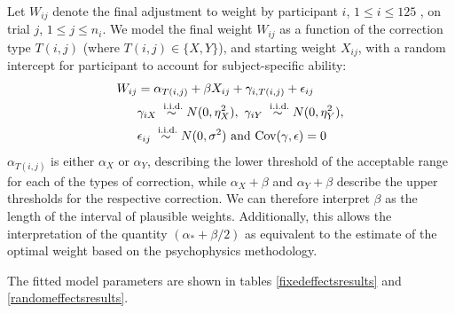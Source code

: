 \documentclass[12pt]{article}\usepackage[]{graphicx}\usepackage[]{color}
\begin{document}
\begin{appendix}
Let $W_{ij}$ denote the final adjustment to weight by participant $i$, $ 1 \le i \le 125$ , on trial $j$, $1 \le j \le n_i$. 
We model the final weight $W_{ij}$ as a function of the correction type $T(i,j)$  (where $T(i,j) \in  \{X, Y\}$), and starting weight $X_{ij}$, with a random intercept for participant to account for subject-specific ability: 
\begin{align}\label{model1}
W_{ij} &= \alpha_{T(i,j)} + \beta X_{ij} + \gamma_{i, T(i,j)} + \epsilon_{ij}\\
& \gamma_{iX} \stackrel{\text{ i.i.d.}}{\sim} N(0, \eta_X^2) , \ \gamma_{iY} \stackrel{\text{ i.i.d.}}{\sim} N(0, \eta_Y^2) ,\notag  \\
& \epsilon_{ij} \stackrel{\text{ i.i.d.}}{\sim} N(0, \sigma^2)  \text{ and } \text{Cov}(\gamma, \epsilon) = 0\notag 
\end{align}
 $\alpha_{T(i,j)}$ is either $\alpha_X$ or $\alpha_Y$, describing the lower threshold of the acceptable range for each of the types of correction, while $\alpha_X+\beta$ and $\alpha_Y + \beta$ describe the upper thresholds for the respective correction.
%
%
We can therefore interpret $\beta$ as the length of the interval of plausible weights. Additionally, this allows the interpretation of the quantity $(\alpha_* + \beta/2)$ as equivalent to the estimate of the optimal weight based on the psychophysics methodology.

\noindent
The fitted model parameters are shown in tables \ref{fixedeffectsresults} and \ref{randomeffectsresults}. 



\end{appendix}
\end{document}

